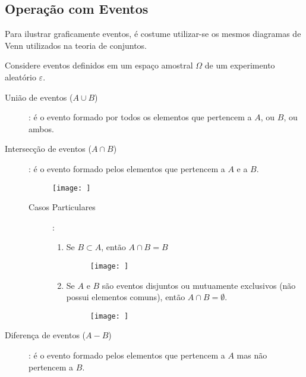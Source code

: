 \documentclass[11pt,a4paper]{book}
\begin{document}
\subsection{Operação com Eventos}
Para ilustrar graficamente eventos, é costume utilizar-se os mesmos diagramas de Venn utilizados na teoria de conjuntos.

Considere eventos definidos em um espaço amostral $\Omega$ de um experimento aleatório $\varepsilon$.

\begin{description}
  \item [União de eventos ($A \cup B$)]: é o evento formado por todos os elementos que pertencem a $A$, ou  $B$, ou ambos.
    \begin{figure}
    \end{figure}

  \item [Intersecção de eventos ($A \cap B$)]: é o evento formado pelos elementos que pertencem a $A$ e a $B$.
    \begin{figure}[]
      \centering
      \texttt{[image: ]}
      \caption{}
      \label{figura:2}
    \end{figure} 
    \begin{description}
      \item[Casos Particulares]:
    \begin{enumerate}
      \item Se $B \subset A$, então $A \cap B= B$ 

        \begin{figure}[]
          \centering
          \texttt{[image: ]}
          \caption{}
          \label{figura:3}
        \end{figure}

      \item Se $A$ e $B$ são eventos disjuntos ou mutuamente exclusivos (não possui elementos comuns), então $A\cap B = \emptyset$.

        \begin{figure}[]
          \centering
          \texttt{[image: ]}
          \caption{}
          \label{figura:4}
        \end{figure}

    \end{enumerate}
  \end{description}
  \item[Diferença de eventos ($A-B$)]: é o evento formado pelos elementos que pertencem a $A$ mas não pertencem a $B$.


\end{description}
\end{document}
